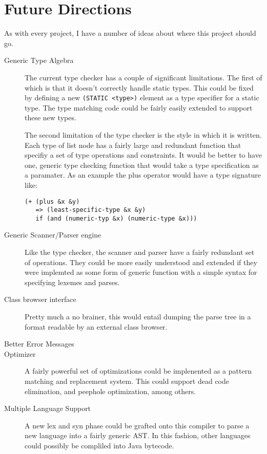 \documentclass{article}[1994/05/24]
\begin{document}
\section{Future Directions}

	As with every project, I have a number of ideas about where
this project should go.

\begin{description}

\item[Generic Type Algebra] 

	The current type checker has a couple of significant limitations.
The first of which is that it doesn't correctly handle static types. This
could be fixed by defining a new \verb|(STATIC <type>)| element as 
a type specifier for a static type.  The type matching code could be fairly
easily extended to support these new types.

	The second limitation of the type checker is the style in which
it is written.  Each type of list node has a fairly large and redundant
function that specifiy a set of type operations and constraints.  It
would be better to have one, generic type checking function that
would take a type specification as a paramater.  As an example the plus
operator would have a type signature like:

\begin{verbatim}
(+ (plus &x &y) 
   => (least-specific-type &x &y)
   if (and (numeric-typ &x) (numeric-type &x)))
\end{verbatim}

\item[Generic Scanner/Parser engine]

	Like the type checker, the scanner and parser have a fairly
redundant set of operations.  They could be more easily understood
and extended if they were implemted as some form of generic function
with a simple syntax for specifying lexemes and parses.

\item[Class browser interface]

	Pretty much a no brainer, this would entail dumping the parse
tree in a format readable by an external class browser.

\item[Better Error Messages]

\item[Optimizer]

	A fairly powerful set of optimizations could be implenented
as a pattern matching and replacement system.  This could support
dead code elimination, and peephole optimization, among others.

\item[Multiple Language Support]

	A new lex and syn phase could be grafted onto this compiler
to parse a new language into a fairly generic AST. In this fashion, other
languages could possibly be compliled into Java bytecode.

\end{description}
\end{document}
